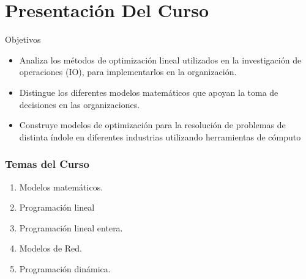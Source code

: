 \section{Presentación Del Curso}
\begin{frame}{Objetivos}

  \begin{itemize} \justifying \parskip3mm

\item	Analiza los métodos de optimización lineal utilizados en la investigación de operaciones (IO), para implementarlos en la organización.
\item	Distingue los diferentes modelos matemáticos que apoyan la toma de decisiones en las organizaciones.
\item	Construye modelos de optimización para la resolución de problemas de distinta índole en diferentes industrias utilizando herramientas de cómputo  



  \end{itemize}

  
  
\end{frame}

\begin{frame}
  \frametitle{Temas del Curso}
  \begin{enumerate} \justifying \parskip3mm
  \item<only@1> Modelos matemáticos.
\item<only@1> Programación lineal
\item<only@1> Programación lineal entera.
\item<only@1> Modelos de Red.
\item<only@1> Programación dinámica.


  \end{enumerate}

\end{frame}




